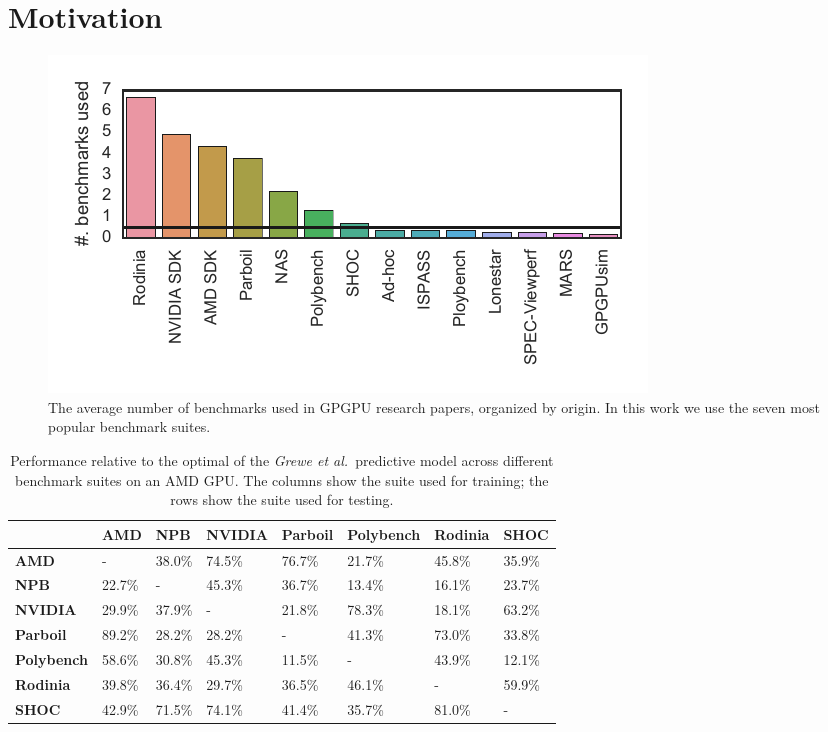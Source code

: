 \section{Motivation}\label{subsec:motivation}

\begin{figure}[t]
  \includegraphics[width=\columnwidth]{img/motivation-c} %
  \caption{%
    The average number of benchmarks used in GPGPU research papers, organized by
    origin. In this work we use the seven most popular benchmark suites.%
  }%
  \label{fig:benchmark-suite-distribution}
\end{figure}

\begin{table}
  \scriptsize%
  \centering%
  \begin{tabular}{ R{1.5cm} C{1.5cm} C{1.5cm} C{1.5cm} C{1.5cm} C{1.5cm} C{1.5cm} C{1.5cm} }
    \toprule
    & \textbf{AMD} & \textbf{NPB} & \textbf{NVIDIA} & \textbf{Parboil} & \textbf{Polybench} & \textbf{Rodinia} & \textbf{SHOC}\\
    \midrule
    \textbf{AMD} & - & 38.0\% & 74.5\% & 76.7\% & 21.7\% & 45.8\% & 35.9\%\\
    \textbf{NPB} & 22.7\% & - & 45.3\% & 36.7\% & 13.4\% & 16.1\% & 23.7\%\\
    \textbf{NVIDIA} & 29.9\% & 37.9\% & - & 21.8\% & 78.3\% & 18.1\% & 63.2\%\\
    \textbf{Parboil} & 89.2\% & 28.2\% & 28.2\% & - & 41.3\% & 73.0\% & 33.8\%\\
    \textbf{Polybench} & 58.6\% & 30.8\% & 45.3\% & 11.5\% & - & 43.9\% & 12.1\%\\
  \textbf{Rodinia} & 39.8\% & 36.4\% & 29.7\% & 36.5\% & 46.1\% & - & 59.9\%\\
  \textbf{SHOC} & 42.9\% & 71.5\% & 74.1\% & 41.4\% & 35.7\% & 81.0\% & -\\
  \end{tabular}
  \caption{Performance relative to the optimal of the \emph{Grewe et al.\ }predictive model across different benchmark suites on an AMD GPU. The columns show the suite used for training; the rows show the suite used for testing.}%
  \label{tab:benchmark-xval}
\end{table}

